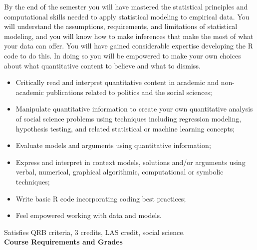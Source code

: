 \documentclass[12pt]{article}
\begin{document}
\noindent By the end of the semester you will have mastered the statistical principles and computational skills needed to apply statistical modeling to empirical data.  You will understand the assumptions, requirements, and limitations of statistical modeling, and you will know how to make inferences that make the most of what your data can offer.  You will have gained considerable expertise developing the R code to do this.  In doing so you will be empowered to make your own choices about what quantitative content to believe and what to dismiss.
\begin{itemize}
\item Critically read and interpret quantitative content in academic and non-academic publications related to politics and the social sciences;
\item Manipulate quantitative information to create your own quantitative analysis of social science problems using techniques including regression modeling, hypothesis testing, and related statistical or machine learning concepts;
\item Evaluate models and arguments using quantitative information;
\item Express and interpret in context models, solutions and/or arguments using verbal, numerical, graphical algorithmic, computational or symbolic techniques;
\item Write basic R code incorporating coding best practices;
\item Feel empowered working with data and models.
\end{itemize}
Satisfies QRB criteria, 3 credits, LAS credit, social science.\\

\noindent \Large \textbf{Course Requirements and Grades}\normalsize\\

\end{document}
